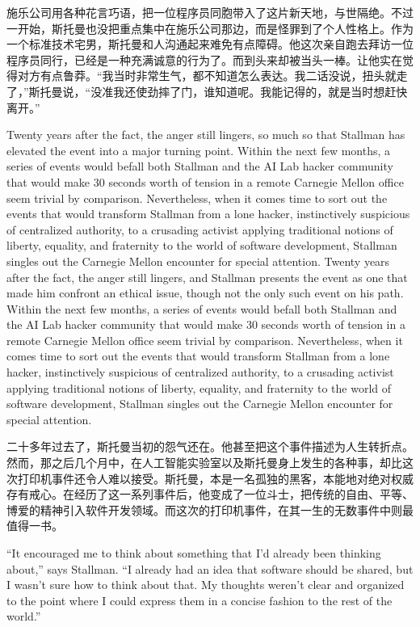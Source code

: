 \ifdefined\chs
施乐公司用各种花言巧语，把一位程序员同胞带入了这片新天地，与世隔绝。不过一开始，斯托曼也没把重点集中在施乐公司那边，而是怪罪到了个人性格上。作为一个标准技术宅男，斯托曼和人沟通起来难免有点障碍。他这次亲自跑去拜访一位程序员同行，已经是一种充满诚意的行为了。而到头来却被当头一棒。让他实在觉得对方有点鲁莽。``我当时非常生气，都不知道怎么表达。我二话没说，扭头就走了，''斯托曼说，``没准我还使劲摔了门，谁知道呢。我能记得的，就是当时想赶快离开。''
\fi

\ifdefined\eng
\ifdefined\vone
Twenty years after the fact, the anger still lingers, so much so that Stallman has elevated the event into a major turning point. Within the next few months, a series of events would befall both Stallman and the AI Lab hacker community that would make 30 seconds worth of tension in a remote Carnegie Mellon office seem trivial by comparison. Nevertheless, when it comes time to sort out the events that would transform Stallman from a lone hacker, instinctively suspicious of centralized authority, to a crusading activist applying traditional notions of liberty, equality, and fraternity to the world of software development, Stallman singles out the Carnegie Mellon encounter for special attention.
\fi
\ifdefined\vtwo
Twenty years after the fact, the anger still lingers, and Stallman presents the event as one that made him confront an ethical issue, though not the only such event on his path. Within the next few months, a series of events would befall both Stallman and the AI Lab hacker community that would make 30 seconds worth of tension in a remote Carnegie Mellon office seem trivial by comparison. Nevertheless, when it comes time to sort out the events that would transform Stallman from a lone hacker, instinctively suspicious of centralized authority, to a crusading activist applying traditional notions of liberty, equality, and fraternity to the world of software development, Stallman singles out the Carnegie Mellon encounter for special attention.
\fi
\fi

\ifdefined\chs
二十多年过去了，斯托曼当初的怨气还在。他甚至把这个事件描述为人生转折点。然而，那之后几个月中，在人工智能实验室以及斯托曼身上发生的各种事，却比这次打印机事件还令人难以接受。斯托曼，本是一名孤独的黑客，本能地对绝对权威存有戒心。在经历了这一系列事件后，他变成了一位斗士，把传统的自由、平等、博爱的精神引入软件开发领域。而这次的打印机事件，在其一生的无数事件中则最值得一书。
\fi

\ifdefined\vone
\ifdefined\eng
``It encouraged me to think about something that I'd already been thinking
about,'' says Stallman. ``I already had an idea that software should be shared,
but I wasn't sure how to think about that. My thoughts weren't clear and
organized to the point where I could express them in a concise fashion to the
rest of the world.'' 
\fi

